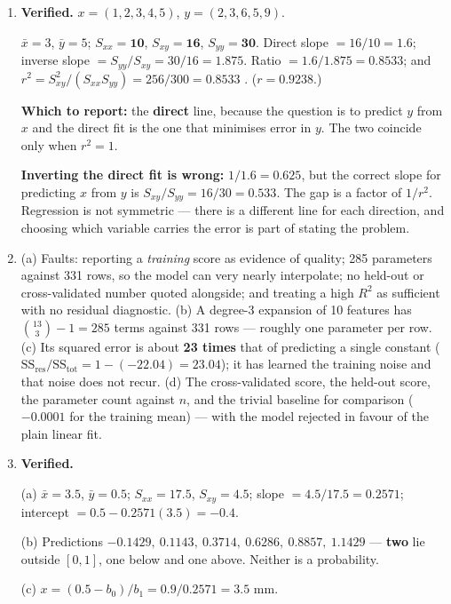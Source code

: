 \documentclass[11pt,a4paper]{article}
\newcommand{\A}[1]{\item[\textbf{#1}]}
\begin{document}
\begin{enumerate}[leftmargin=1.9cm]
\A{U5.57} \textbf{Verified.} $x = (1,2,3,4,5)$, $y = (2,3,6,5,9)$.
\begin{answerbox}
$\bar x = 3$, $\bar y = 5$; $S_{xx} = \mathbf{10}$, $S_{xy} = \mathbf{16}$,
$S_{yy} = \mathbf{30}$.
Direct slope $= 16/10 = \mathbf{1.6}$; inverse slope
$= S_{yy}/S_{xy} = 30/16 = \mathbf{1.875}$.
Ratio $= 1.6/1.875 = \mathbf{0.8533}$; and
$r^2 = S_{xy}^2/(S_{xx}S_{yy}) = 256/300 = \mathbf{0.8533}$ \checkmark.
($r = 0.9238$.)

\textbf{Which to report:} the \textbf{direct} line, because the question is to
predict $y$ from $x$ and the direct fit is the one that minimises error in $y$.
The two coincide only when $r^2 = 1$.

\textbf{Inverting the direct fit is wrong:} $1/1.6 = 0.625$, but the correct
slope for predicting $x$ from $y$ is $S_{xy}/S_{yy} = 16/30 = 0.533$. The gap
is a factor of $1/r^2$. Regression is not symmetric --- there is a different
line for each direction, and choosing which variable carries the error is part
of stating the problem.
\end{answerbox}

\A{U5.58} (a) Faults: reporting a \emph{training} score as evidence of quality;
285 parameters against 331 rows, so the model can very nearly interpolate;
no held-out or cross-validated number quoted alongside; and treating a high
$R^2$ as sufficient with no residual diagnostic. (b) A degree-3 expansion of 10
features has $\binom{13}{3} - 1 = 285$ terms against 331 rows --- roughly one
parameter per row. (c) Its squared error is about \textbf{23 times} that of
predicting a single constant ($\text{SS}_{\text{res}}/\text{SS}_{\text{tot}}
= 1-(-22.04) = 23.04$); it has learned the training noise and that noise does not recur.
(d) The cross-validated score, the held-out score, the parameter count against
$n$, and the trivial baseline for comparison ($-0.0001$ for the training mean)
--- with the model rejected in favour of the plain linear fit.

\A{U5.59} \textbf{Verified.}
\begin{answerbox}
(a) $\bar x = 3.5$, $\bar y = 0.5$; $S_{xx} = \mathbf{17.5}$,
$S_{xy} = \mathbf{4.5}$; slope $= 4.5/17.5 = \mathbf{0.2571}$;
intercept $= 0.5 - 0.2571(3.5) = \mathbf{-0.4}$.

(b) Predictions $\mathbf{-0.1429},\ 0.1143,\ 0.3714,\ 0.6286,\ 0.8857,\
\mathbf{1.1429}$ --- \textbf{two} lie outside $[0,1]$, one below and one
above. Neither is a probability.

(c) $x = (0.5 - b_0)/b_1 = 0.9/0.2571 = \mathbf{3.5}$ mm.


\end{answerbox}
\end{enumerate}
\end{document}

